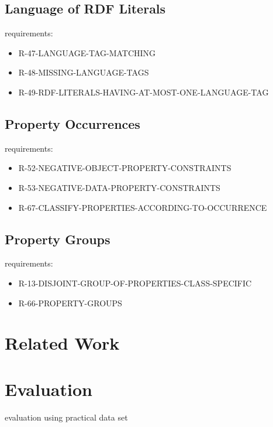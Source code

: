 \documentclass{llncs}
\begin{document}
\subsection{Language of RDF Literals}

requirements:

\begin{itemize}
	\item R-47-LANGUAGE-TAG-MATCHING
  \item R-48-MISSING-LANGUAGE-TAGS
	\item R-49-RDF-LITERALS-HAVING-AT-MOST-ONE-LANGUAGE-TAG
\end{itemize}

\subsection{Property Occurrences}

requirements:

\begin{itemize}
	\item R-52-NEGATIVE-OBJECT-PROPERTY-CONSTRAINTS
	\item R-53-NEGATIVE-DATA-PROPERTY-CONSTRAINTS
	\item R-67-CLASSIFY-PROPERTIES-ACCORDING-TO-OCCURRENCE
\end{itemize}

\subsection{Property Groups}

requirements:

\begin{itemize}
	\item R-13-DISJOINT-GROUP-OF-PROPERTIES-CLASS-SPECIFIC
	\item R-66-PROPERTY-GROUPS
\end{itemize}



\section{Related Work}



\section{Evaluation}

evaluation using practical data set
\end{document}
